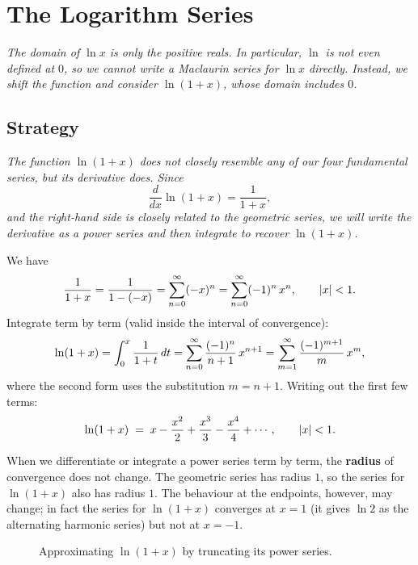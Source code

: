 \section{The Logarithm Series}
\label{sec:14.10}

\textit{The domain of $\ln x$ is only the positive reals.  In particular, $\ln$ is not even defined at $0$, so we cannot write a Maclaurin series for $\ln x$ directly.  Instead, we shift the function and consider $\ln(1+x)$, whose domain includes $0$.}

\subsection*{Strategy}

\textit{The function $\ln(1+x)$ does not closely resemble any of our four fundamental series, but its derivative does.  Since}
\[
  \frac{d}{dx}\ln(1+x) = \frac{1}{1+x},
\]
\textit{and the right-hand side is closely related to the geometric series, we will write the derivative as a power series and then integrate to recover $\ln(1+x)$.}

\begin{example}
\label{ex:14-9}
We have
\[
  \frac{1}{1+x} = \frac{1}{1-(-x)}
  = \sum_{n=0}^{\infty}(-x)^{n}
  = \sum_{n=0}^{\infty}(-1)^{n}\,x^{n},
  \qquad \left\lvert x \right\rvert<1.
\]
Integrate term by term (valid inside the interval of convergence):
\[
  \ln(1+x)
  = \int_{0}^{x}\frac{1}{1+t}\,dt
  = \sum_{n=0}^{\infty}\frac{(-1)^{n}}{n+1}\,x^{n+1}
  = \sum_{m=1}^{\infty}\frac{(-1)^{m+1}}{m}\,x^{m},
\]
where the second form uses the substitution $m=n+1$.  Writing out the first few terms:
\[
  \ln(1+x) \;=\; x - \frac{x^{2}}{2} + \frac{x^{3}}{3} - \frac{x^{4}}{4} + \cdots, \qquad \left\lvert x \right\rvert<1.
\]
\end{example}

\begin{remark}
When we differentiate or integrate a power series term by term, the \textbf{radius} of convergence does not change.  The geometric series has radius $1$, so the series for $\ln(1+x)$ also has radius $1$.  The behaviour at the endpoints, however, may change; in fact the series for $\ln(1+x)$ converges at $x=1$ (it gives $\ln 2$ as the alternating harmonic series) but not at $x=-1$.
\end{remark}

\begin{figure}[ht]
  \centering
  
  \caption{Approximating $\ln(1+x)$ by truncating its power series.}
  \label{fig:log-series}
\end{figure}

